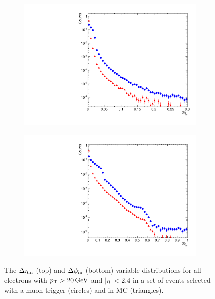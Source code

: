 \begin{figure}[!htbp]
    \centering
    \begin{subfigure}[b]{0.65\textwidth}
        \includegraphics[width=\textwidth]{figures/deta.pdf}
        \caption{}
        \label{fig:deta}
    \end{subfigure}
    \begin{subfigure}[b]{0.65\textwidth}
        \includegraphics[width=\textwidth]{figures/dphi.pdf}
        \caption{}
        \label{fig:dphi}
    \end{subfigure}
    \caption[
        Distributions of $\detain$ and $\dphiin$ in data and MC.
    ]{
        The $\detain$ (top) and $\dphiin$ (bottom) variable distributions for
        all electrons with $p_{\mathrm{T}} > 20 \,\text{Ge\hspace{-.08em}V}$ and $|\eta| < 2.4$ in a set of
        events selected with a muon trigger (circles) and in \MADGRAPH \Ztoee
        MC (triangles).
    }
    \label{fig:dtrack}
\end{figure}

